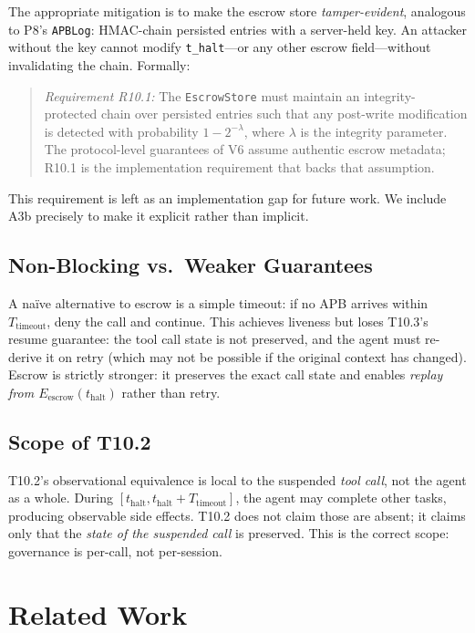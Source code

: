 \documentclass[11pt]{article}
\newcommand{\Eescrow}{E_{\mathrm{escrow}}}
\newcommand{\thalt}{t_{\mathrm{halt}}}
\newcommand{\Ttimeout}{T_{\mathrm{timeout}}}
\begin{document}
The appropriate mitigation is to make the escrow store
\emph{tamper-evident}, analogous to P8's \texttt{APBLog}: HMAC-chain
persisted entries with a server-held key. An attacker without the key
cannot modify \texttt{t\_halt}---or any other escrow field---without
invalidating the chain. Formally:

\begin{quote}
\emph{Requirement R10.1:} The \texttt{EscrowStore} must maintain an
integrity-protected chain over persisted entries such that any
post-write modification is detected with probability
$1 - 2^{-\lambda}$, where $\lambda$ is the integrity parameter.
The protocol-level guarantees of V6 assume authentic escrow metadata;
R10.1 is the implementation requirement that backs that assumption.
\end{quote}

This requirement is left as an implementation gap for future work.
We include A3b precisely to make it explicit rather than implicit.

\subsection{Non-Blocking vs.\ Weaker Guarantees}

A na\"ive alternative to escrow is a simple timeout: if no APB arrives
within $\Ttimeout$, deny the call and continue. This achieves liveness
but loses T10.3's resume guarantee: the tool call state is not preserved,
and the agent must re-derive it on retry (which may not be possible if
the original context has changed). Escrow is strictly stronger: it
preserves the exact call state and enables \emph{replay from
$\Eescrow(\thalt)$} rather than retry.

\subsection{Scope of T10.2}

T10.2's observational equivalence is local to the suspended
\emph{tool call}, not the agent as a whole. During $[\thalt,
\thalt + \Ttimeout]$, the agent may complete other tasks, producing
observable side effects. T10.2 does not claim those are absent; it
claims only that the \emph{state of the suspended call} is preserved.
This is the correct scope: governance is per-call, not per-session.

\section{Related Work}
\label{sec:related}
\end{document}
